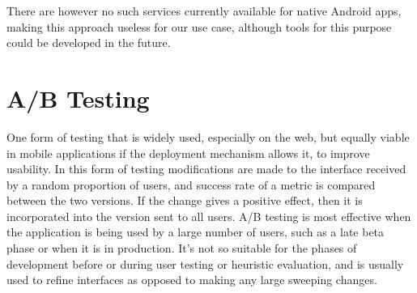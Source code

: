 There are however no such services currently available for native Android apps,
making this approach useless for our use case, although tools for this purpose
could be developed in the future.

\section{A/B Testing}

One form of testing that is widely used, especially on the web, but equally
viable in mobile applications if the deployment mechanism allows it, to improve
usability. In this form of testing modifications are made to the interface
received by a random proportion of users, and success rate of a metric is
compared between the two versions. If the change gives a positive effect, then
it is incorporated into the version sent to all users. A/B testing is most effective
when the application is being used by a large number of users, such as a late
beta phase or when it is in production. It's not so suitable for the phases
of development before or during user testing or heuristic evaluation, and is
usually used to refine interfaces as opposed to making any large sweeping changes.
